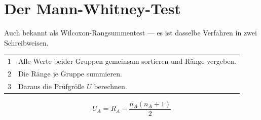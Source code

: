 \section{Der Mann-Whitney-Test}

\begin{merksatz}
Auch bekannt als Wilcoxon-Rangsummentest --- es ist dasselbe Verfahren in zwei Schreibweisen.

\begin{center}
\renewcommand{\arraystretch}{1.5}
\begin{tabular}{@{}P{1.0cm}P{7.4cm}@{}}
\toprule
$1$ & Alle Werte beider Gruppen gemeinsam sortieren und Ränge vergeben.\\
$2$ & Die Ränge je Gruppe summieren.\\
$3$ & Daraus die Prüfgröße $U$ berechnen.\\
\bottomrule
\end{tabular}
\end{center}
\[ U_A = R_A - \frac{n_A(n_A+1)}{2} \]
\end{merksatz}

